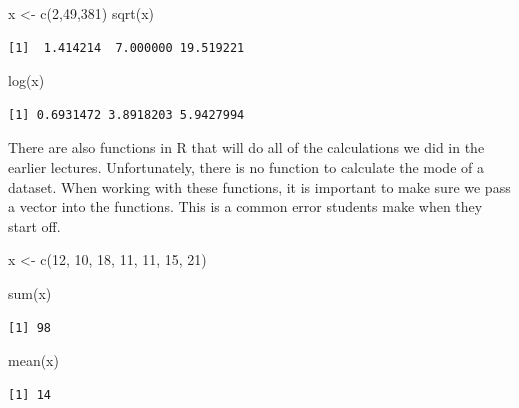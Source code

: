 \documentclass[
  letterpaper,
  DIV=11,
  numbers=noendperiod]{scrreprt}
\newenvironment{Shaded}{\begin{snugshade}}{\end{snugshade}}
\newcommand{\DecValTok}[1]{\textcolor[rgb]{0.68,0.00,0.00}{#1}}
\newcommand{\FunctionTok}[1]{\textcolor[rgb]{0.28,0.35,0.67}{#1}}
\newcommand{\NormalTok}[1]{\textcolor[rgb]{0.00,0.23,0.31}{#1}}
\newcommand{\OtherTok}[1]{\textcolor[rgb]{0.00,0.23,0.31}{#1}}
\begin{document}
\begin{Shaded}
\begin{Highlighting}[]
\NormalTok{x }\OtherTok{\textless{}{-}} \FunctionTok{c}\NormalTok{(}\DecValTok{2}\NormalTok{,}\DecValTok{49}\NormalTok{,}\DecValTok{381}\NormalTok{)}
\FunctionTok{sqrt}\NormalTok{(x)}
\end{Highlighting}
\end{Shaded}

\begin{verbatim}
[1]  1.414214  7.000000 19.519221
\end{verbatim}

\begin{Shaded}
\begin{Highlighting}[]
\FunctionTok{log}\NormalTok{(x)}
\end{Highlighting}
\end{Shaded}

\begin{verbatim}
[1] 0.6931472 3.8918203 5.9427994
\end{verbatim}

There are also functions in R that will do all of the calculations we
did in the earlier lectures. Unfortunately, there is no function to
calculate the mode of a dataset. When working with these functions, it
is important to make sure we pass a vector into the functions. This is a
common error students make when they start off.

\begin{Shaded}
\begin{Highlighting}[]
\NormalTok{x }\OtherTok{\textless{}{-}} \FunctionTok{c}\NormalTok{(}\DecValTok{12}\NormalTok{, }\DecValTok{10}\NormalTok{, }\DecValTok{18}\NormalTok{, }\DecValTok{11}\NormalTok{, }\DecValTok{11}\NormalTok{, }\DecValTok{15}\NormalTok{, }\DecValTok{21}\NormalTok{)}

\FunctionTok{sum}\NormalTok{(x)}
\end{Highlighting}
\end{Shaded}

\begin{verbatim}
[1] 98
\end{verbatim}

\begin{Shaded}
\begin{Highlighting}[]
\FunctionTok{mean}\NormalTok{(x)}
\end{Highlighting}
\end{Shaded}

\begin{verbatim}
[1] 14
\end{verbatim}
\end{document}
